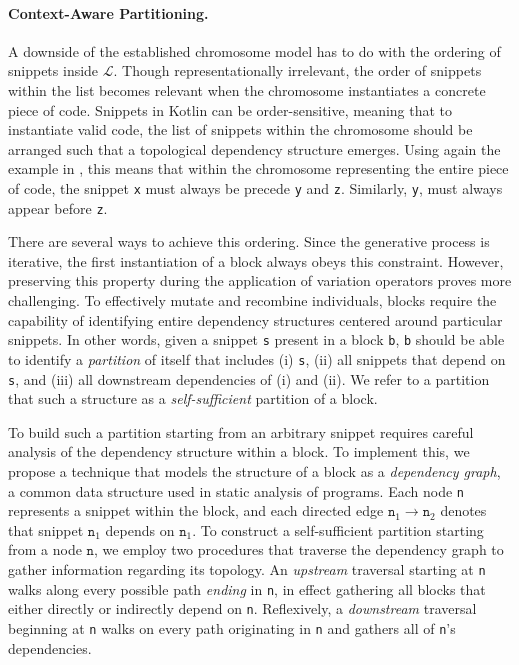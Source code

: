 \paragraph{Context-Aware Partitioning.} A downside of the
established chromosome model has to do with the ordering of
snippets inside $\mathcal{L}$.
Though representationally irrelevant, the order of snippets within
the list becomes relevant when the chromosome instantiates
a concrete piece of code.
Snippets in Kotlin can be order-sensitive, meaning that to
instantiate valid code, the list of snippets within the chromosome
should be arranged such that a topological dependency structure
emerges.
Using again the example in , this means
that within the chromosome representing the entire piece of code,
the snippet \texttt{x} must always be precede \texttt{y} and \texttt{z}.
Similarly, \texttt{y}, must always appear before \texttt{z}.

There are several ways to achieve this ordering.
Since the generative process is iterative, the first instantiation
of a block always obeys this constraint.
However, preserving this property during the application of
variation operators proves more challenging.
To effectively mutate and recombine individuals,
blocks require the capability of
identifying entire dependency structures centered around particular snippets.
In other words, given a snippet \texttt{s} present in a block
\texttt{b}, \texttt{b} should be able to  identify a \textit{partition}
of itself that includes (i) \texttt{s}, (ii) all snippets
that depend on \texttt{s}, and (iii) all downstream dependencies of (i) and (ii).
We refer to a partition that such a structure as a \textit{self-sufficient} partition
of a block.

To build such a partition starting from an arbitrary snippet
requires careful analysis of the dependency structure within a block.
To implement this, we propose a technique that models the
structure of a block as a \textit{dependency graph}, a common
data structure used in static analysis of programs.
Each node \texttt{n} represents a snippet within the block,
and each directed edge $\texttt{n}_1 \to \texttt{n}_2$
denotes that snippet $\texttt{n}_1$ depends on $\texttt{n}_1$.
To construct a self-sufficient partition starting from a node $\texttt{n}$,
we employ two procedures that traverse the dependency graph
to gather information regarding its topology.
An \textit{upstream} traversal starting at \texttt{n} walks
along every possible path \textit{ending} in \texttt{n}, in
effect gathering all blocks that either directly or indirectly depend on \texttt{n}.
Reflexively, a \textit{downstream} traversal beginning at \texttt{n}
walks on every path originating in \texttt{n} and gathers all of \texttt{n}'s
dependencies.

